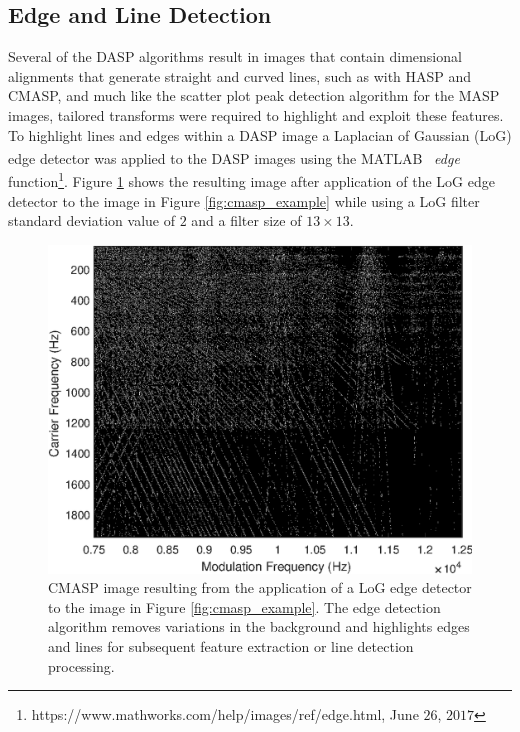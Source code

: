 \subsection[Edge and Line Detection]{Edge and Line Detection}
\label{Edge and Line Detection}

Several of the DASP algorithms result in images that contain dimensional alignments that generate straight and curved lines, such as with HASP and CMASP, and much like the scatter plot peak detection algorithm for the MASP images, tailored transforms were required to highlight and exploit these features.  To highlight lines and edges within a DASP image a Laplacian of Gaussian (LoG) edge detector \cite{Marr1980} was applied to the DASP images using the MATLAB\textsuperscript \textregistered ~ \textit{edge} function\footnote{https://www.mathworks.com/help/images/ref/edge.html, June $26$, $2017$}.  Figure \ref{fig:cmasp_edge} shows the resulting image after application of the LoG edge detector to the image in Figure \ref{fig:cmasp_example} while using a LoG filter standard deviation value of $2$ and a filter size of $13 \times 13$.  

\begin{figure}[tb]
	\includegraphics[width=\textwidth]{./dasp_algorithm_results/cmasp_edge_filenum_9601.eps}
	\centering
	\caption{CMASP image resulting from the application of a LoG edge detector to the image in Figure \ref{fig:cmasp_example}.  The edge detection algorithm removes variations in the background and highlights edges and lines for subsequent feature extraction or line detection processing.}
	\label{fig:cmasp_edge}
\end{figure}

